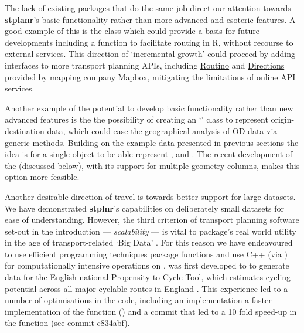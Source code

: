 The lack of existing packages that do the same job direct our attention towards \textbf{stplanr}'s basic functionality rather than more advanced and esoteric features.
A good example of this is the  class which could provide a basis for future developments including a  function to facilitate routing in R, without recourse to external services.
This direction of `incremental growth' could proceed by adding interfaces to more transport planning APIs, including \href{https://www.routino.org/uk/}{Routino} and \href{https://www.mapbox.com/directions/}{Directions} provided by mapping company Mapbox, mitigating the limitations of online API services.

Another example of the potential to develop basic functionality rather than new advanced features is the the possibility of creating an `' class to represent origin-destination data, which could ease the geographical analysis of OD data via generic methods.
Building on the example data presented in previous sections the idea is for a single  object to be able represent ,  and .
The recent development of the  (discussed below), with its support for multiple geometry columns, makes this option more feasible.

Another desirable direction of travel is towards better support for large datasets.
We have demonstrated \textbf{stplnr}'s capabilities on deliberately small datasets for ease of understanding.
However, the third criterion of transport planning software set-out in the introduction --- \emph{scalability} --- is vital to package's real world utility in the age of transport-related `Big Data' \citep{lovelace_big_2016}.
For this reason we have endeavoured to use efficient programming techniques package functions and use C++ (via ) for computationally intensive operations on .
 was first developed to to generate data for the English national Propensity to Cycle Tool, which estimates cycling potential across all major cyclable routes in England \citep{lovelace_propensity_2017}.
This experience led to a number of optimisations in the code, including an implementation a faster implementation of the  function () and a commit that led to a 10 fold speed-up in the  function (see commit \href{https://github.com/ropensci/stplanr/commit/c834abf7d0020c6fbb33845572d6be4801f31f47}{c834abf}).

